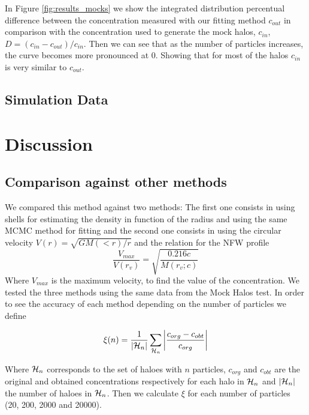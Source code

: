 \documentclass[useAMS,usenatbib]{mn2e}
\begin{document}
In Figure \ref{fig:results_mocks} we show the integrated distribution
percentual difference between the concentration measured with our
fitting method $c_{out}$ in comparison with the concentration used to
generate the mock halos, $c_{in}$, $D=(c_{in}-c_{out})/c_{in}$. Then we can see that as the number of particles increases, the curve becomes more pronounced at 0. Showing that for most of the halos $c_{in}$ is very similar to $c_{out}$.


\subsection{Simulation Data}
\label{sec:results_mocks}

\section{Discussion}
\label{sec:discussion}

\subsection{Comparison against other methods}
We compared this method against two methods: The first one consists in using shells for estimating the density in function of the radius and using the same MCMC method for fitting and the second one consists in using the circular velocity $V(r)=\sqrt{GM(<r)/r}$ and the relation for the NFW profile
\begin{equation}
\frac{V_{max}}{V(r_{v})} = \sqrt{\frac{0.216c}{M(r_{v};c)}}
\end{equation}
Where $V_{max}$ is the maximum velocity, to find the value of the concentration. We tested the three methods using the same data from the Mock Halos test. In order to see the accuracy of each method depending on the number of particles we define 

\begin{equation}
\xi(n)=\frac{1}{\left|{\cal{H}}_n\right|}\sum_{{\cal{H}}_n}\left|\frac{c_{org}-c_{obt}}{c_{org}}\right|
\end{equation}

Where ${\cal{H}}_n$ corresponds to the set of haloes with $n$ particles, $c_{org}$ and $c_{obt}$ are the original and obtained concentrations respectively for each halo in ${\cal{H}}_n$ and $\left|{\cal{H}}_n\right|$ the number of haloes in ${\cal{H}}_n$. Then we calculate $\xi$ for each number of particles (20, 200, 2000 and 20000).
\end{document}
